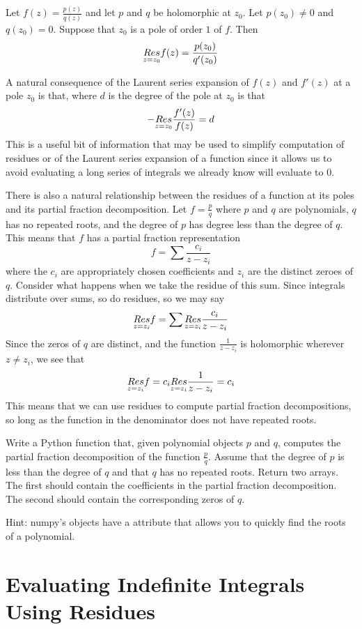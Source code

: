 Let $f(z)=\frac{p(z)}{q(z)}$ and let $p$ and $q$ be holomorphic at $z_0$. Let $p(z_0) \neq 0$ and $q(z_0)=0$.
Suppose that $z_0$ is a pole of order $1$ of $f$.
Then
\[\underset{z=z_0}{Res} f(z) = \frac{p(z_0)}{q'(z_0)}\]

A natural consequence of the Laurent series expansion of $f(z)$ and $f'(z)$ at a pole $z_0$ is that, where $d$ is the degree of the pole at $z_0$ is that
\[- \underset{z=z_0}{Res} \frac{f'(z)}{f(z)} = d\]
This is a useful bit of information that may be used to simplify computation of residues or of the Laurent series expansion of a function since it allows us to avoid evaluating a long series of integrals we already know will evaluate to $0$.

There is also a natural relationship between the residues of a function at its poles and its partial fraction decomposition.
Let $f = \frac{p}{q}$ where $p$ and $q$ are polynomials, $q$ has no repeated roots, and the degree of $p$ has degree less than the degree of $q$.
This means that $f$ has a partial fraction representation
\[f = \sum \frac{c_i}{z - z_i}\]
where the $c_i$ are appropriately chosen coefficients and $z_i$ are the distinct zeroes of $q$.
Consider what happens when we take the residue of this sum.
Since integrals distribute over sums, so do residues, so we may say
\[\underset{z=z_i}{Res} f = \sum \underset{z=z_i}{Res} \frac{c_i}{z - z_i}\]
Since the zeros of $q$ are distinct, and the function $\frac{1}{z - z_i}$ is holomorphic wherever $z \neq z_i$, we see that
\[\underset{z=z_i}{Res} f = c_i \underset{z=z_i}{Res} \frac{1}{z-z_i} = c_i\]
This means that we can use residues to compute partial fraction decompositions, so long as the function in the denominator does not have repeated roots.

\begin{problem}
Write a Python function that, given polynomial objects $p$ and $q$, computes the partial fraction decomposition of the function $\frac{p}{q}$.
Assume that the degree of $p$ is less than the degree of $q$ and that $q$ has no repeated roots.
Return two arrays.
The first should contain the coefficients in the partial fraction decomposition.
The second should contain the corresponding zeros of $q$.

Hint: numpy's  objects have a  attribute that allows you to quickly find the roots of a polynomial.
\end{problem}

\section*{Evaluating Indefinite Integrals Using Residues}

